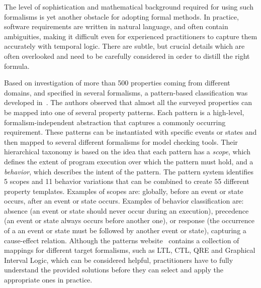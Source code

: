 \documentclass[letter]{llncs}
\begin{document}
The level of sophistication and mathematical background required for using such formalisms is yet another obstacle for adopting formal methods. 
In practice, software requirements are written in natural language, and often contain ambiguities, making it difficult even for experienced 
practitioners to capture them accurately with temporal logic. There are subtle, but crucial details which are often overlooked and 
need to be carefully considered in order to distill the right formula.

Based on investigation of more than 500 properties coming from different domains, and specified in several formalisms, a pattern-based classification
was developed in~\cite{Dwyer:1999:PPS:302405.302672}. The authors observed that almost all the surveyed properties
can be mapped into one of several property patterns. Each pattern is a
high-level, formalism-independent abstraction that captures a
commonly occurring requirement. These patterns can be instantiated with specific
events or states and then mapped to several different formalisms for model
checking tools. Their hierarchical taxonomy is based on the idea that each
pattern has a \emph{scope}, which defines the extent of program execution over
which the pattern must hold, and a \emph{behavior}, which describes the intent of the pattern. The pattern
system identifies 5 scopes and 11 behavior variations that can be
combined to create 55 different property templates. Examples of scopes are: globally,
before an event or state occurs, after an event or state occurs.
Examples of behavior classification are: absence (an event or state should never
occur during an execution), precedence (an event or
state always occurs before another one), 
or response (the occurrence of a an event or state must be followed by
another event or state), capturing a cause-effect relation.
Although the patterns website~\cite{PSP} contains a collection of mappings for
different target formalisms, such as LTL, CTL, QRE and Graphical Interval Logic, which can be considered helpful,
practitioners have to fully understand the provided solutions before they can
select and apply the appropriate ones in practice.
\end{document}
